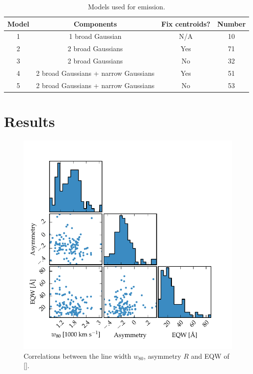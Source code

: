 \begin{table}
  \centering
  \small 
  \caption{Models used for \ha emission.}
  \label{tab:hamod}
    \begin{tabular}{cccc} 
    \hline
    Model     & Components & Fix centroids? & Number \\
    \hline
    1        & 1 broad Gaussian  & N/A &  10 \\
    2        & 2 broad Gaussians & Yes &  71 \\
    3        & 2 broad Gaussians & No  &  32 \\
    4        & 2 broad Gaussians + narrow Gaussians & Yes & 51 \\
    5        & 2 broad Gaussians + narrow Gaussians & No  & 53 \\
    \hline
    \end{tabular}
\end{table} 

\section{Results}


\begin{figure}
    \includegraphics[width=\columnwidth]{figures/chapter04/parameters_grid.pdf} 
    \caption{Correlations between the line width $w_{80}$, asymmetry $R$ and \ac{EQW} of [].}     
    \label{fig:parameters_grid}
\end{figure}

